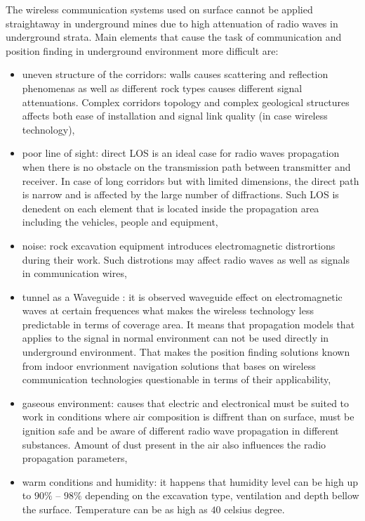 \documentclass[../main.tex]{subfiles}
\begin{document}
The wireless communication systems used on surface cannot be applied straightaway in underground mines due to high attenuation of radio waves in underground strata. Main elements that cause the task of communication and position finding in underground environment more difficult are\cite{article_mine_communications_3_characteristics}:
\begin{itemize}
	\item uneven structure of the corridors: walls causes scattering and reflection phenomenas as well as different rock types causes different signal attenuations. Complex corridors topology and complex geological structures affects both ease of installation and signal link quality (in case wireless technology),
	\item poor line of sight: direct LOS is an ideal case for radio waves propagation when there is no obstacle on the transmission path between transmitter and receiver. In case of long corridors but with limited dimensions, the direct path is narrow and is affected by the large number of diffractions. Such LOS is denedent on each element that is located inside the propagation area including the vehicles, people and equipment,
	\item noise: rock excavation equipment introduces electromagnetic distrortions during their work. Such distrotions may affect radio waves as well as signals in  communication wires,
	\item tunnel as a Waveguide \cite{rf_in_tunnel_waveguide_effect}\cite{article_rf_propagation_practical_full}: it is observed waveguide effect on electromagnetic waves at certain frequences what makes the wireless technology less predictable in terms of coverage area. It means that propagation models that applies to the signal in normal environment can not be used directly in underground environment. That makes the position finding solutions known from indoor envrionment navigation solutions that bases on wireless communication technologies questionable in terms of their applicability,
	\item gaseous environment: causes that electric and electronical must be suited to work in conditions where air composition is diffrent than on surface, must be ignition safe and be aware of different radio wave propagation in different substances. Amount of dust present in the air also influences the radio propagation parameters,
	\item warm conditions and humidity: it happens that humidity level can be high up to $90\%$ -- $98\%$ depending on the excavation type, ventilation and depth bellow the surface. Temperature can be as high as $40$ celsius degree.
\end{itemize}
\end{document}
